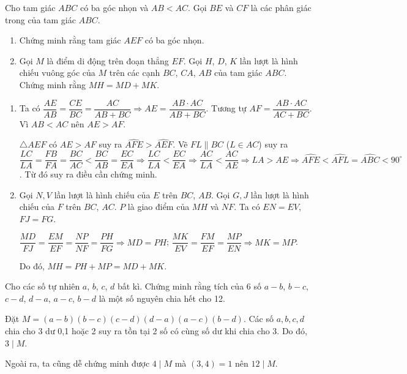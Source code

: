 \begin{ex}%
    Cho tam giác $ABC$ có ba góc nhọn và $AB<AC$. Gọi $BE$ và $CF$ là các phân giác trong của tam giác $ABC$.
    \begin{enumerate}
    	\item Chứng minh rằng tam giác $AEF$ có ba góc nhọn.
    	\item Gọi $M$ là điểm di động trên đoạn thẳng $EF$. Gọi $H$, $D$, $K$ lần lượt là hình chiếu vuông góc của $M$ trên các cạnh $BC$, $CA$, $AB$ của tam giác $ABC$. Chứng minh rằng $MH=MD+MK$.
    \end{enumerate}
\loigiai
    {\begin{center}
    	\end{center}
    	    	\begin{enumerate}
    		\item Ta có $\dfrac{AE}{AB}=\dfrac{CE}{BC}=\dfrac{AC}{AB+BC}\Rightarrow AE=\dfrac{AB\cdot AC}{AB+BC}$. Tương tự $AF=\dfrac{AB\cdot AC}{AC+BC}$. Vì $AB<AC$ nên $AE>AF$. 
    		
    		$\triangle AEF$ có $AE>AF$ suy ra $\widehat{AFE}>\widehat{AEF}$. Vẽ $FL\parallel BC$ ($L\in AC$) suy ra $\dfrac{LC}{LA}=\dfrac{FB}{FA}=\dfrac{BC}{AC}<\dfrac{BC}{AB}=\dfrac{EC}{EA}\Rightarrow \dfrac{LC}{LA}<\dfrac{EC}{EA}\Rightarrow\dfrac{AC}{LA}<\dfrac{AC}{AE}\Rightarrow LA>AE\Rightarrow\widehat{AFE}<\widehat{AFL}=\widehat{ABC}<90^\circ$. Từ đó suy ra điều cần chứng minh.
    		\item Gọi $N,V$ lần lượt là hình chiếu của $E$ trên $BC$, $AB$. Gọi $G, J$ lần lượt là hình chiếu của $F$ trên $BC$, $AC$. $P$ là giao điểm của $MH$ và $NF$. Ta có $EN=EV$, $FJ=FG$.
    		
    		$\dfrac{MD}{FJ}=\dfrac{EM}{EF}=\dfrac{NP}{NF}=\dfrac{PH}{FG}\Rightarrow MD=PH$; $\dfrac{MK}{EV}=\dfrac{FM}{EF}=\dfrac{MP}{EN}\Rightarrow MK=MP$.
    		
    		Do đó, $MH=PH+MP=MD+MK$.
    \end{enumerate}}
\end{ex}
\begin{ex}%
Cho các số tự nhiên $a$, $b$, $c$, $d$ bất kì. Chứng minh rằng tích của 6 số $a-b$, $b-c$, $c-d$, $d-a$, $a-c$, $b-d$ là một số nguyên chia hết cho 12.
	\loigiai
	{Đặt $M=(a-b)(b-c)(c-d)(d-a)(a-c)(b-d)$. Các số $a,b,c,d$ chia cho 3 dư 0,1 hoặc 2 suy ra tồn tại 2 số có cùng số dư khi chia cho 3. Do đó, $3\mid M$.
	
Ngoài ra, ta cũng dễ chứng minh được $4\mid M$ mà $(3,4)=1$ nên $12\mid M$.}
\end{ex}
